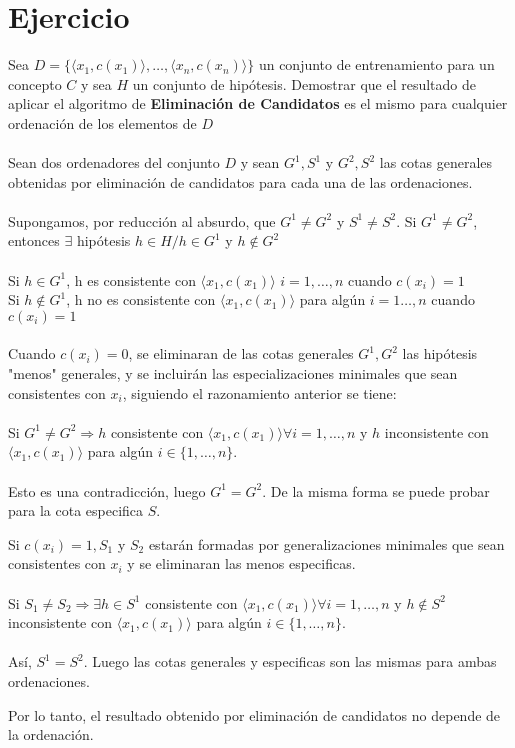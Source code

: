 \documentclass{article}
\begin{document}
\section{Ejercicio}
Sea \(D =\{ \langle x_1,c(x_1)\rangle,\ldots, \langle x_n,c(x_n)\rangle\}\) un conjunto de entrenamiento para un concepto \(C\) y sea \(H\) un conjunto de hipótesis. Demostrar que el resultado de aplicar el algoritmo de \textbf{Eliminación
de Candidatos} es el mismo para cualquier ordenación de los elementos de \(D\)\\\\
Sean dos ordenadores del conjunto \(D\) y sean \(G^1, S^1\) y \(G^2, S^2\) las cotas generales obtenidas por eliminación de candidatos para cada una de las ordenaciones.\\\\
Supongamos, por reducción al absurdo, que \(G^1 \neq G^2\) y \(S^1 \neq S^2\).
Si \(G^1 \neq G^2\), entonces \(\exists\) hipótesis \(h  \in H / h \in G^1\) y \(h \notin G^2\)\\\\
Si \(h \in G^1\), h es consistente con \(\langle x_1,c(x_1)\rangle\) \(i = 1, \ldots, n\) cuando \(c(x_i)=1\)\\
Si \(h \notin G^1\), h no es consistente con \(\langle x_1,c(x_1)\rangle\) para algún \(i = 1\ldots, n\) cuando \(c(x_i)=1\)\\\\
Cuando \(c(x_i)=0\), se eliminaran de las cotas generales \(G^1, G^2\) las hipótesis "menos" generales, y se incluirán  las especializaciones minimales que sean consistentes con \(x_i\), siguiendo el razonamiento anterior se tiene:\\\\
Si \(G^1 \neq G^2 \Rightarrow h\) consistente con \(\langle x_1,c(x_1)\rangle  \forall i = 1, \ldots,n\) y \(h\) inconsistente con \(\langle x_1,c(x_1)\rangle\) para algún \(i \in \{1, \ldots,n\}\).\\\\
Esto es una contradicción, luego \(G^1 = G^2\). De la misma forma se puede probar para la cota especifica \(S\).

Si \(c(x_i)=1, S_1\) y \(S_2\) estarán formadas por generalizaciones minimales que sean consistentes con \(x_i\) y se eliminaran las menos especificas.\\\\
Si \(S_1 \neq S_2 \Rightarrow \exists h \in S^1\) consistente con \(\langle x_1,c(x_1)\rangle \forall i = 1, \ldots,n\) y \(h \notin S^2\) inconsistente con \(\langle x_1,c(x_1)\rangle\) para algún \(i\in \{1, \ldots,n\}\).\\\\
Así, \(S^1 =  S^2\). Luego las cotas generales y especificas son las mismas para ambas ordenaciones.
 \begin{center}
Por lo tanto, el resultado obtenido por eliminación de candidatos no depende de la ordenación.   
 \end{center}
\end{document}
